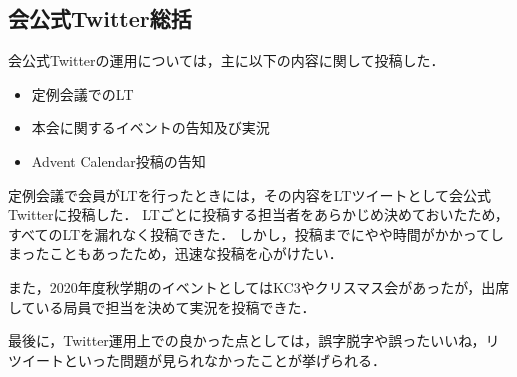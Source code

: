 \subsection*{会公式Twitter総括}



会公式Twitterの運用については，主に以下の内容に関して投稿した．

\begin{itemize}
\item 定例会議でのLT
\item 本会に関するイベントの告知及び実況
\item Advent Calendar投稿の告知
\end{itemize}


定例会議で会員がLTを行ったときには，その内容をLTツイートとして会公式Twitterに投稿した．
LTごとに投稿する担当者をあらかじめ決めておいたため，すべてのLTを漏れなく投稿できた．
しかし，投稿までにやや時間がかかってしまったこともあったため，迅速な投稿を心がけたい．

また，2020年度秋学期のイベントとしてはKC3やクリスマス会があったが，出席している局員で担当を決めて実況を投稿できた．

最後に，Twitter運用上での良かった点としては，誤字脱字や誤ったいいね，リツイートといった問題が見られなかったことが挙げられる．
